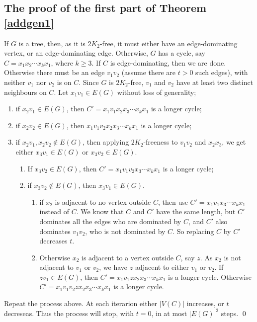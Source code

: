 \documentclass[runningheads,a4paper]{llncs}
\begin{document}
\subsection{The proof of the first part of Theorem \ref{addgen1}}
If $G$ is a tree, then, as it is $2K_2$-free, it must either have an edge-dominating
vertex, or an edge-dominating edge.
Otherwise, $G$ has a cycle, say $C=x_1x_2\cdots x_kx_1$, where $k\ge3$.
If $C$ is edge-dominating, then we are done. 
Otherwise
there must be an edge $v_1v_2$ (assume there are $t>0$ such edges), 
with neither $v_1$ nor $v_2$ is on $C$. 
Since $G$ is $2K_2$-free, $v_1$ and $v_2$ have at least two distinct neighbours on $C$. 
Let $x_1v_1\in E(G)$ without loss of generality; 
\begin{enumerate}
\item if $x_2v_1\in E(G)$, then $C'=x_1v_1x_2x_3\cdots x_kx_1$ is a longer cycle;
\item if $x_2v_2\in E(G)$, then $x_1v_1v_2x_2x_3\cdots x_kx_1$ is a longer cycle; 
\item if $x_2v_1,x_2v_2\not\in E(G)$, then applying $2K_2$-freeness to $v_1v_2$ and $x_2x_3$, 
we get either $x_3v_1\in E(G)$ or $x_3v_2\in E(G)$.
\begin{enumerate}
\item If $x_3v_2\in E(G)$, then $C'=x_1v_1v_2x_3\cdots x_kx_1$ is a longer cycle;
\item if $x_3v_2\not\in E(G)$, then $x_3v_1\in E(G)$.
\begin{enumerate}
\item if $x_2$ is adjacent to no vertex outside $C$, then use $C'=x_1v_1x_3\cdots x_kx_1$ instead of $C$. 
We know that $C$ and $C'$ have the same length, but $C'$ dominates all the edges who are dominated by $C$, and $C'$ also dominates $v_1v_2$, who is not dominated by $C$. So replacing $C$ by $C'$
decreases $t$.
\item Otherwise $x_2$ is adjacent to a vertex outside $C$, say $z$.
As $x_2$ is not adjacent to $v_1$ or $v_2$, we have $z$ adjacent to either $v_1$ or $v_2$. If $zv_1\in E(G)$, then $C'=x_1v_1zx_2x_3\cdots x_kx_1$ is a longer cycle.
Otherwise $C'=x_1v_1v_2zx_2x_3\cdots x_kx_1$ is a longer cycle.
\end{enumerate}
\end{enumerate}
\end{enumerate}
Repeat the process above. At each iterarion either $|V(C)|$ increases, or $t$ decreseas.
Thus the process will stop, with $t=0$, in at most $|E(G)|^2$ steps. 
\qed
\end{document}

